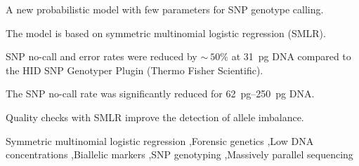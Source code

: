 \documentclass[Enhanced-SNP-genotyping-with-SMLR.tex]{subfiles}
\begin{document}
\begin{frontmatter}
\onecolumn
\begin{highlights}
\item A new probabilistic model with few parameters for SNP genotype calling.
\item The model is based on symmetric multinomial logistic regression (SMLR).
\item SNP no-call and error rates were reduced by $\sim\!\!\!\:50\%$ at \SI{31}{\pg} DNA compared to the HID SNP Genotyper Plugin (Thermo Fisher Scientific).
\item The SNP no-call rate was significantly reduced for \SIrange[range-units = single, range-phrase = --]{62}{250}{\pg} DNA.
\item Quality checks with SMLR improve the detection of allele imbalance.
\end{highlights}


\begin{keyword}
Symmetric multinomial logistic regression \sep Forensic genetics \sep Low DNA concentrations \sep Biallelic markers \sep SNP genotyping \sep Massively parallel sequencing


\end{keyword}
\end{frontmatter}
\end{document}
